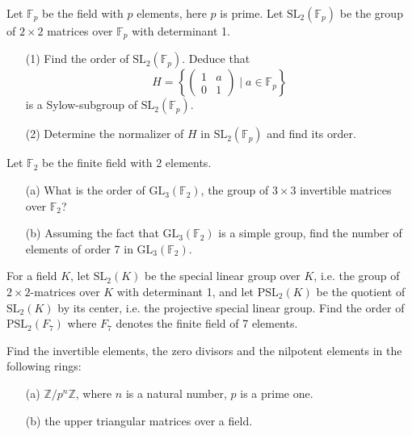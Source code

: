 \begin{prob}[S2006-Q1]
    Let \(\mathbb{F}_p\) be the field with \(p\) elements, here \(p\) is prime. Let \(\text{SL}_2(\mathbb{F}_p)\) be the group of \(2 \times 2\) matrices over \(\mathbb{F}_p\) with determinant 1.
    \begin{itemize}
        \item[(1)] Find the order of \(\text{SL}_2(\mathbb{F}_p)\). Deduce that
        \[H = \left\{ \begin{pmatrix} 1 & a \\ 0 & 1 \end{pmatrix} \mid a \in \mathbb{F}_p \right\}\]
        is a Sylow-subgroup of \(\text{SL}_2(\mathbb{F}_p)\).
        \item[(2)] Determine the normalizer of \(H\) in \(\text{SL}_2(\mathbb{F}_p)\) and find its order.
    \end{itemize}
\end{prob}


\begin{prob}[S2004-Q1]
    Let \(\mathbb{F}_2\) be the finite field with 2 elements.
    \begin{itemize}
        \item[(a)] What is the order of \(\text{GL}_3(\mathbb{F}_2)\), the group of \(3 \times 3\) invertible matrices over \(\mathbb{F}_2\)?
        \item[(b)] Assuming the fact that \(\text{GL}_3(\mathbb{F}_2)\) is a simple group, find the number of elements of order 7 in \(\text{GL}_3(\mathbb{F}_2)\).
    \end{itemize}
\end{prob}

\begin{prob}[S2002-Q4]
    For a field \(K\), let \(\text{SL}_2(K)\) be the special linear group over \(K\), i.e. the group of \(2 \times 2\)-matrices over \(K\) with determinant 1, and let \(\text{PSL}_2(K)\) be the quotient of \(\text{SL}_2(K)\) by its center, i.e. the projective special linear group. Find the order of \(\text{PSL}_2(F_7)\) where \(F_7\) denotes the finite field of 7 elements.
\end{prob}


\begin{prob}[S2007-Q4]
    Find the invertible elements, the zero divisors and the nilpotent elements in the following rings:
    \begin{itemize}
        \item[(a)] \(\mathbb{Z}/p^n\mathbb{Z}\), where \(n\) is a natural number, \(p\) is a prime one.
        \item[(b)] the upper triangular matrices over a field.
    \end{itemize}
\end{prob}

